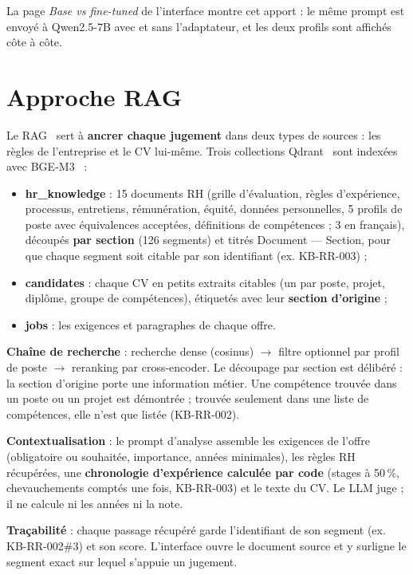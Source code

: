 \documentclass[11pt,a4paper]{report}
\newcommand{\kb}[1]{\textsf{#1}}
\begin{document}
La page \emph{Base vs fine-tuned} de l'interface montre cet apport : le même prompt est envoyé à Qwen2.5-7B avec et sans l'adaptateur, et les deux profils sont affichés côte à côte.

\chapter{Approche RAG}

Le RAG~\cite{rag} sert à \textbf{ancrer chaque jugement} dans deux types de sources : les règles de l'entreprise et le CV lui-même. Trois collections Qdrant~\cite{qdrant} sont indexées avec BGE-M3~\cite{bgem3} :
\begin{itemize}
\item \textbf{hr\_knowledge} : 15 documents RH (grille d'évaluation, règles d'expérience, processus, entretiens, rémunération, équité, données personnelles, 5 profils de poste avec équivalences acceptées, définitions de compétences ; 3 en français), découpés \textbf{par section} (126 segments) et titrés \og Document --- Section\fg{}, pour que chaque segment soit citable par son identifiant (ex. \kb{KB-RR-003}) ;
\item \textbf{candidates} : chaque CV en petits extraits citables (un par poste, projet, diplôme, groupe de compétences), étiquetés avec leur \textbf{section d'origine} ;
\item \textbf{jobs} : les exigences et paragraphes de chaque offre.
\end{itemize}

\textbf{Chaîne de recherche} : recherche dense (cosinus) $\rightarrow$ filtre optionnel par profil de poste $\rightarrow$ reranking par cross-encoder. Le découpage par section est délibéré : la section d'origine porte une information métier. Une compétence trouvée dans un poste ou un projet est \og démontrée\fg{} ; trouvée seulement dans une liste de compétences, elle n'est que \og listée\fg{} (\kb{KB-RR-002}).

\textbf{Contextualisation} : le prompt d'analyse assemble les exigences de l'offre (obligatoire ou souhaitée, importance, années minimales), les règles RH récupérées, une \textbf{chronologie d'expérience calculée par code} (stages à 50\,\%, chevauchements comptés une fois, \kb{KB-RR-003}) et le texte du CV. Le LLM juge ; il ne calcule ni les années ni la note.

\textbf{Traçabilité} : chaque passage récupéré garde l'identifiant de son segment (ex. \kb{KB-RR-002\#3}) et son score. L'interface ouvre le document source et y surligne le segment exact sur lequel s'appuie un jugement.
\end{document}
